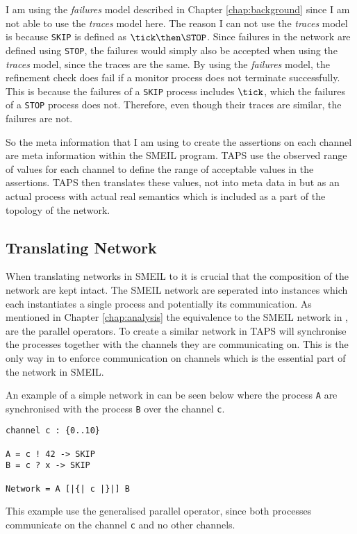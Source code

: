 I am using the \textit{failures} model described in Chapter \ref{chap:background} since I am not able to use the \textit{traces} model here. The reason I can not use the \textit{traces} model is because \texttt{SKIP} is defined as $\tick \then \STOP$. Since failures in the network are defined using \texttt{STOP}, the failures would simply also be accepted when using the \textit{traces} model, since the traces are the same. By using the \textit{failures} model, the refinement check does fail if a monitor process does not terminate successfully. This is because the failures of a \texttt{SKIP} process includes $\tick$, which the failures of a \texttt{STOP} process does not. Therefore, even though their traces are similar, the failures are not.


So the meta information that I am using to create the assertions on each channel are meta information within the SMEIL program. TAPS use the observed range of values for each channel to define the range of acceptable values in the assertions. TAPS then translates these values, not into meta data in \cspm{} but as an actual process with actual real semantics which is included as a part of the topology of the \cspm{} network.


\subsection{Translating Network}
\label{sec:design_translating_network}
When translating networks in SMEIL to \cspm{} it is crucial that the composition of the network are kept intact. The SMEIL network are seperated into instances which each instantiates a single process and potentially its communication. As mentioned in Chapter \ref{chap:analysis} the equivalence to the SMEIL network in \cspm{}, are the parallel operators. To create a similar network in \cspm{} TAPS will synchronise the processes together with the channels they are communicating on.
This is the only way in \cspm{} to enforce communication on channels which is the essential part of the network in SMEIL.

An example of a simple network in \cspm{} can be seen below where the process \texttt{A} are synchronised with the process \texttt{B} over the channel \texttt{c}.
\begin{verbatim}
channel c : {0..10}

A = c ! 42 -> SKIP
B = c ? x -> SKIP

Network = A [|{| c |}|] B
\end{verbatim}
This example use the generalised parallel operator, since both processes communicate on the channel \texttt{c} and no other channels.

